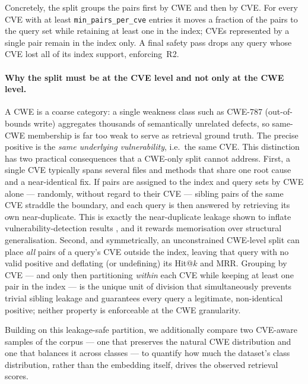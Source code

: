 \documentclass[11pt, a4paper]{article}
\begin{document}
Concretely, the split groups the pairs first by CWE and then by CVE. For every
CVE with at least \texttt{min\_pairs\_per\_cve} entries it moves a fraction of the
pairs to the query set while retaining at least one in the index; CVEs
represented by a single pair remain in the index only. A final safety pass drops
any query whose CVE lost all of its index support, enforcing~R2.

\paragraph{Why the split must be at the CVE level and not only at the CWE level.}
A CWE is a coarse category: a single weakness class such as CWE-787
(out-of-bounds write) aggregates thousands of semantically unrelated defects, so
same-CWE membership is far too weak to serve as retrieval ground truth. The
precise positive is the \emph{same underlying vulnerability}, i.e.\ the same CVE.
This distinction has two practical consequences that a CWE-only split cannot
address. First, a single CVE typically spans several files and methods that share
one root cause and a near-identical fix. If pairs are assigned to the index and
query sets by CWE alone --- randomly, without regard to their CVE --- sibling
pairs of the same CVE straddle the boundary, and each query is then answered by
retrieving its own near-duplicate. This is exactly the near-duplicate leakage
shown to inflate vulnerability-detection results
\cite{chakraborty2020reveal, croft2023dataquality}, and it rewards memorisation
over structural generalisation. Second, and symmetrically, an unconstrained
CWE-level split can place \emph{all} pairs of a query's CVE outside the index,
leaving that query with no valid positive and deflating (or undefining) its
Hit@$k$ and MRR. Grouping by CVE --- and only then partitioning \emph{within}
each CVE while keeping at least one pair in the index --- is the unique unit of
division that simultaneously prevents trivial sibling leakage and guarantees
every query a legitimate, non-identical positive; neither property is enforceable
at the CWE granularity.

Building on this leakage-safe partition, we additionally compare two CVE-aware
samples of the corpus --- one that preserves the natural CWE distribution and one
that balances it across classes --- to quantify how much the dataset's class
distribution, rather than the embedding itself, drives the observed retrieval
scores.
\end{document}
